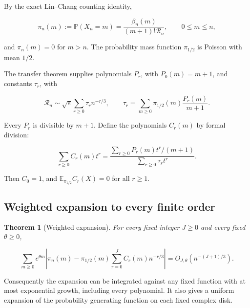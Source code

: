 \documentclass[11pt,letterpaper]{article}
\newtheorem{theorem}{Theorem}[section]
\theoremstyle{remark}
\begin{document}
By the exact Lin--Chang counting identity,

\[
 \pi_n(m):=\mathbb P(X_n=m)=\frac{\beta_n(m)}{(m+1)!\mathcal R_n},
                  \qquad 0\le m\le n,                       \tag{D1}\label{tcn:b:D1}
\]

and \(\pi_n(m)=0\) for \(m>n\). The probability mass function \(\pi_{1/2}\) is
Poisson with mean \(1/2\).

The transfer theorem supplies polynomials \(P_r\), with \(P_0(m)=m+1\),
and constants \(\tau_r\), with

\[
 \mathcal R_n\sim\sqrt e\sum_{r\ge0}\tau_rn^{-r/3},\qquad
 \tau_r=\sum_{m\ge0}\pi_{1/2}(m)\frac{P_r(m)}{m+1}.
\]

Every \(P_r\) is divisible by \(m+1\). Define the polynomials \(C_r(m)\)
by formal division:

\[
 \sum_{r\ge0}C_r(m)t^r
 =\frac{\sum_{r\ge0}P_r(m)t^r/(m+1)}{\sum_{r\ge0}\tau_rt^r}.
                                                               \tag{D2}\label{tcn:b:D2}
\]

Then \(C_0=1\), and \(\mathbb E_{\pi_{1/2}} C_r(X)=0\) for all \(r\ge1\).

\subsection{Weighted expansion to every finite
order}\label{tcn:b:weighted-expansion-to-every-finite-order}

\begin{theorem}[Weighted expansion]\label{tcn:b:thm:weighted}
For every fixed integer \(J\ge0\) and every fixed
\(\theta\ge0\),

\[
 \sum_{m\ge0}e^{\theta m}\left|
 \pi_n(m)-\pi_{1/2}(m)\sum_{r=0}^JC_r(m)n^{-r/3}
 \right|=O_{J,\theta}(n^{-(J+1)/3}).                          \tag{D3}\label{tcn:b:D3}
\]
\end{theorem}

Consequently the expansion can be integrated against any fixed function
with at most exponential growth, including every polynomial. It also
gives a uniform expansion of the probability generating function on each
fixed complex disk.
\end{document}
